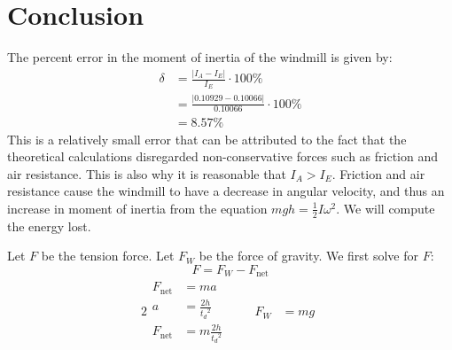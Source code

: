 \documentclass[article, 11pt]{article}
\newcommand{\df}{\displaystyle\frac} %
\begin{document}
    \section{Conclusion}
    \noindent
    The percent error in the moment of inertia of the windmill is given by:
    \begin{align*}
        \delta &= \frac{|I_A - I_E|}{I_E} \cdot 100\% \\
               &= \frac{|0.10929 - 0.10066|}{0.10066} \cdot 100\% \\
               &= 8.57\%
    \end{align*}
    This is a relatively small error that can be attributed to the fact that the theoretical calculations disregarded non-conservative forces such as friction and air resistance. This is also why it is reasonable that $I_A > I_E$. Friction and air resistance cause the windmill to have a decrease in angular velocity, and thus an increase in moment of inertia from the equation $mgh = \df{1}{2}I\omega^2$. We will compute the energy lost.
    \begin{comment}
    \begin{align*}
        E_E                      &= E_A + E_\text{lost} \\
        \frac{1}{2}I_E\omega_E^2 &= \frac{1}{2}I_A\omega_A^2 + E_\text{lost} 
    \end{align*}
    We first compute $\omega_E$, the angular velocity of the expected angular velocity:
    \begin{align*}
        mgh      &= \frac{1}{2}I_E\omega_E^2 \\
        \omega_E &= \sqrt{\frac{2mgh}{I_E}} \\
                 &= \sqrt{\frac{2(0.1)(9.81)(0.77)}{0.10066}} \\
                 &\approx \SI{3.8741}{\frac{\radian}{\second}}
    \end{align*}
    \end{comment}
    Let $F$ be the tension force. Let $F_W$ be the force of gravity. We first solve for $F$:
    \begin{equation*}
        F = F_W - F_\text{net}
    \end{equation*}
    \begin{alignat*}{2}
        \begin{aligned}
            F_\text{net} &= ma \\
                       a &= \frac{2h}{{t_d}^2} \\
            F_\text{net} &= m\frac{2h}{{t_d}^2}
        \end{aligned} & \quad
        \begin{aligned}
            F_W &= mg
        \end{aligned}
    \end{alignat*}
\end{document}
